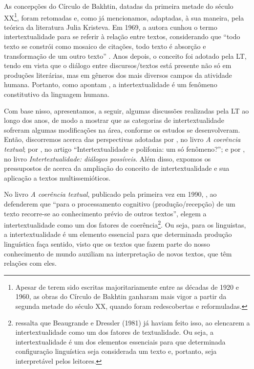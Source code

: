 \documentclass{textolivre}
\begin{document}
As concepções do Círculo de Bakhtin, datadas da primeira metade do século XX\footnote{Apesar de terem sido escritas majoritariamente entre as décadas de 1920 e 1960, as obras do Círculo de Bakhtin ganharam mais vigor a partir da segunda metade do século XX, quando foram redescobertas e reformuladas.}, foram retomadas e, como já mencionamos, adaptadas, à sua maneira, pela teórica da literatura Julia Kristeva. Em 1969, a autora cunhou o termo intertextualidade para se referir à relação entre textos, considerando que “todo texto se constrói como mosaico de citações, todo texto é absorção e transformação de um outro texto” \cite[p. 68]{kristeva_introducao_2005}. Anos depois, o conceito foi adotado pela LT, tendo em vista que o diálogo entre discursos/textos está presente não só em produções literárias, mas em gêneros dos mais diversos campos da atividade humana. Portanto, como apontam \textcite{araujo_consideracoes_2009}, a intertextualidade é um fenômeno constitutivo da linguagem humana.

Com base nisso, apresentamos, a seguir, algumas discussões realizadas pela LT ao longo dos anos, de modo a mostrar que as categorias de intertextualidade sofreram algumas modificações na área, conforme os estudos se desenvolveram. Então, discorremos acerca das perspectivas adotadas por \textcite{koch_coerencia_2015}, no livro \textit{A coerência textual}; por \textcite{koch__1991}, no artigo “Intertextualidade e polifonia: um só fenômeno?”; e por \textcite{koch_intertextualidade:_2012}, no livro \textit{Intertextualidade: diálogos possíveis}. Além disso, expomos os pressupostos de \textcite{mozdzenski_intertextualidade_2013, cavalcante_sobre_2017, garcia_intertextualidade_2020} acerca da ampliação do conceito de intertextualidade e sua aplicação a textos multissemióticos.

No livro \textit{A coerência textual}, publicado pela primeira vez em 1990, \textcite[p. 92]{koch_coerencia_2015}, ao defenderem que “para o processamento cognitivo (produção/recepção) de um texto recorre-se ao conhecimento prévio de outros textos”, elegem a intertextualidade como um dos fatores de coerência\footnote{\textcite{koch__1991} ressalta que Beaugrande e Dressler (1981) já haviam feito isso, ao elencarem a intertextualidade como um dos fatores de textualidade. Ou seja, a intertextualidade é um dos elementos essenciais para que determinada configuração linguística seja considerada um texto e, portanto, seja interpretável pelos leitores.}. Ou seja, para os linguistas, a intertextualidade é um elemento essencial para que determinada produção linguística faça sentido, visto que os textos que fazem parte do nosso conhecimento de mundo auxiliam na interpretação de novos textos, que têm relações com eles.
\end{document}
